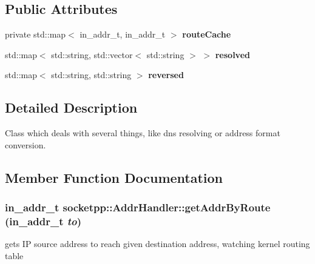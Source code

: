 \subsection*{Public Attributes}
\begin{CompactItemize}
\item 
\hypertarget{classsocketpp_1_1AddrHandler_83570f35a564ec191a98e77f29a00f81}{
private std::map$<$ in\_\-addr\_\-t, in\_\-addr\_\-t $>$ \textbf{routeCache}}
\label{classsocketpp_1_1AddrHandler_83570f35a564ec191a98e77f29a00f81}

\item 
\hypertarget{classsocketpp_1_1AddrHandler_e88a94364ba5cd2515028e696e39ff31}{
std::map$<$ std::string, std::vector$<$ std::string $>$ $>$ \textbf{resolved}}
\label{classsocketpp_1_1AddrHandler_e88a94364ba5cd2515028e696e39ff31}

\item 
\hypertarget{classsocketpp_1_1AddrHandler_ed88f0235717de354eb92a1700d7dc69}{
std::map$<$ std::string, std::string $>$ \textbf{reversed}}
\label{classsocketpp_1_1AddrHandler_ed88f0235717de354eb92a1700d7dc69}

\end{CompactItemize}


\subsection{Detailed Description}
Class which deals with several things, like dns resolving or address format conversion. 

\subsection{Member Function Documentation}
\hypertarget{classsocketpp_1_1AddrHandler_79db1454cc9c12bbd44b526f61ff84fb}{
\subsubsection[{getAddrByRoute}]{\setlength{\rightskip}{0pt plus 5cm}in\_\-addr\_\-t socketpp::AddrHandler::getAddrByRoute (in\_\-addr\_\-t {\em to})}}
\label{classsocketpp_1_1AddrHandler_79db1454cc9c12bbd44b526f61ff84fb}


gets IP source address to reach given destination address, watching kernel routing table 

